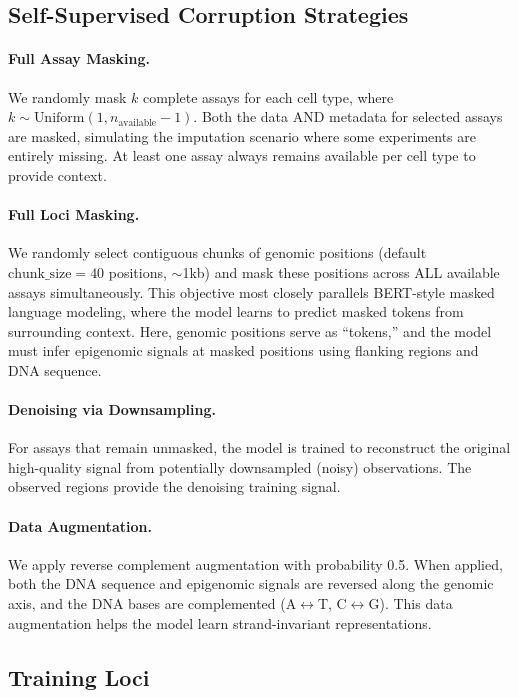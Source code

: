 \subsection{Self-Supervised Corruption Strategies}

\paragraph{Full Assay Masking.}
We randomly mask $k$ complete assays for each cell type, where $k \sim \text{Uniform}(1, n_{\text{available}} - 1)$. Both the data AND metadata for selected assays are masked, simulating the imputation scenario where some experiments are entirely missing. At least one assay always remains available per cell type to provide context.

\paragraph{Full Loci Masking.}
We randomly select contiguous chunks of genomic positions (default $\text{chunk\_size} = 40$ positions, $\sim$1kb) and mask these positions across ALL available assays simultaneously. This objective most closely parallels BERT-style masked language modeling, where the model learns to predict masked tokens from surrounding context. Here, genomic positions serve as ``tokens,'' and the model must infer epigenomic signals at masked positions using flanking regions and DNA sequence.

\paragraph{Denoising via Downsampling.}
For assays that remain unmasked, the model is trained to reconstruct the original high-quality signal from potentially downsampled (noisy) observations. The observed regions provide the denoising training signal.

\paragraph{Data Augmentation.}
We apply reverse complement augmentation with probability 0.5. When applied, both the DNA sequence and epigenomic signals are reversed along the genomic axis, and the DNA bases are complemented (A$\leftrightarrow$T, C$\leftrightarrow$G). This data augmentation helps the model learn strand-invariant representations.

\subsection{Training Loci}


